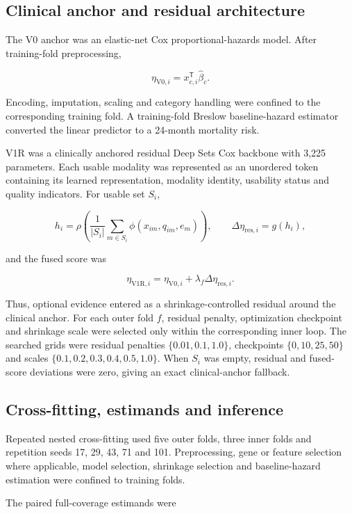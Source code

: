 \documentclass[pdflatex,sn-nature]{sn-jnl}
\begin{document}
\subsection*{Clinical anchor and residual architecture}

The V0 anchor was an elastic-net Cox proportional-hazards model. After training-fold preprocessing,


\[
\eta_{\mathrm{V0},i}=x_{c,i}^{\mathsf T}\hat\beta_c.
\]

Encoding, imputation, scaling and category handling were confined to the corresponding training fold. A training-fold Breslow baseline-hazard estimator converted the linear predictor to a 24-month mortality risk.

V1R was a clinically anchored residual Deep Sets Cox backbone with 3,225 parameters. Each usable modality was represented as an unordered token containing its learned representation, modality identity, usability status and quality indicators. For usable set \(S_i\),


\[
h_i=\rho\left(\frac{1}{|S_i|}\sum_{m\in S_i}\phi(x_{im},q_{im},e_m)\right),
\qquad
\Delta\eta_{\mathrm{res},i}=g(h_i),
\]

and the fused score was


\[
\eta_{\mathrm{V1R},i}=\eta_{\mathrm{V0},i}+\lambda_f\Delta\eta_{\mathrm{res},i}.
\]

Thus, optional evidence entered as a shrinkage-controlled residual around the clinical anchor. For each outer fold \(f\), residual penalty, optimization checkpoint and shrinkage scale were selected only within the corresponding inner loop. The searched grids were residual penalties \(\{0.01,0.1,1.0\}\), checkpoints \(\{0,10,25,50\}\) and scales \(\{0.1,0.2,0.3,0.4,0.5,1.0\}\). When \(S_i\) was empty, residual and fused-score deviations were zero, giving an exact clinical-anchor fallback.

\subsection*{Cross-fitting, estimands and inference}

Repeated nested cross-fitting used five outer folds, three inner folds and repetition seeds 17, 29, 43, 71 and 101. Preprocessing, gene or feature selection where applicable, model selection, shrinkage selection and baseline-hazard estimation were confined to training folds.

The paired full-coverage estimands were
\end{document}
